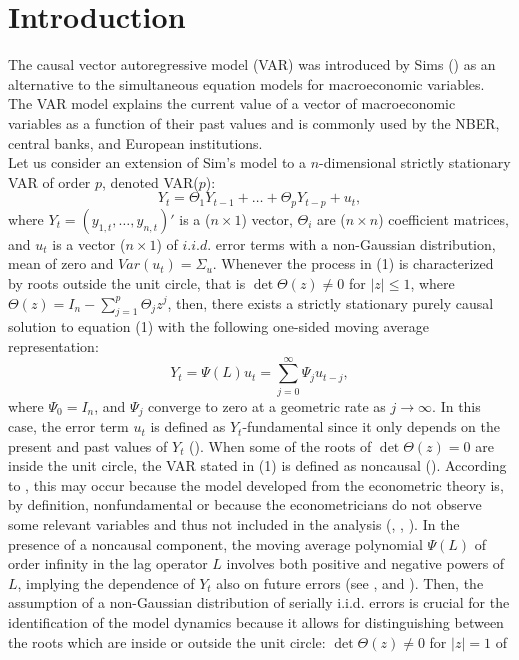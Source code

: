 \documentclass[<1p>]{elsarticle} %
\begin{document}
\section{Introduction}
The causal vector autoregressive model (VAR) was introduced by Sims (\cite{sims1980macroeconomics}) as an alternative to the simultaneous equation models for macroeconomic variables. The VAR model explains the current value of a vector of macroeconomic variables as a function of their past values and is commonly used by the NBER, central banks, and European institutions.\\
\indent Let us consider an extension of Sim's model to a $n$-dimensional strictly stationary VAR of order $p$, denoted VAR($p$):
\begin{equation}
	Y_{t}=\Theta_{1} Y_{t-1} + \dots + \Theta_{p} Y_{t-p} + u_{t},
\end{equation}
where $Y_{t}=( y_{1,t}, \dots , y_{n,t})'$ is a ($n \times 1$) vector, $\Theta_{i}$ are ($n \times n$) coefficient matrices, and $u_t$ is a vector ($n \times 1$) of $i.i.d.$ error terms with a non-Gaussian distribution, mean of zero and $Var(u_{t})=\Sigma_{u}$. Whenever the process in (1) is characterized by roots outside the unit circle, that is $\det\Theta(z)\neq0$ for $|z| \leq 1$, where $\Theta(z)=I_{n}-\sum_{j=1}^{p}\Theta_{j}z^{j}$, then, there exists a strictly stationary purely causal solution to equation (1)  with the following one-sided moving average representation:
\begin{equation}
	Y_{t}=\Psi (L) u_{t}=\sum_{j=0}^{\infty} \Psi_{j} u_{t-j},
\end{equation}
where $\Psi_{0}=I_{n}$, and $\Psi_{j}$ converge to zero at a geometric rate as $j \rightarrow \infty$. In this case, the error term $u_{t}$ is defined as $Y_{t}$-fundamental since it only depends on the present and past values of $Y_{t}$ (\cite{alessi2008review}). When some of the roots of $\det\Theta(z)=0$ are inside the unit circle, the VAR stated in (1) is defined as noncausal (\cite{lanne2011noncausal}). According to \cite{alessi2008review}, this may occur because the model developed from the econometric theory is, by definition, nonfundamental or because the econometricians do not observe some relevant variables and thus not included in the analysis (\cite{blanchard1988dynamic}, \cite{lippi1993dynamic}, \cite{fernandez2007abcs}). In the presence of a noncausal component, the moving average polynomial $\Psi (L)$ of order infinity in the lag operator $L$  involves both positive and negative powers of $L$, implying the dependence of $Y_{t}$ also on future errors (see \cite{alessi2008review}, and \cite{lanne2013noncausal}). Then, the assumption of a non-Gaussian distribution of serially i.i.d. errors is crucial for the identification of the model dynamics because it allows for distinguishing between the roots which are inside or outside the unit circle: $\det\Theta(z)\neq0$ for $|z|=1$ of 
\end{document}
